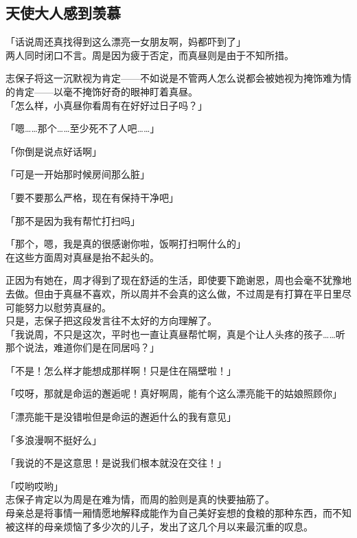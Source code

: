 \subsection{天使大人感到羡慕}

「话说周还真找得到这么漂亮一女朋友啊，妈都吓到了」\\

两人同时闭口不言。周是因为疲于否定，而真昼则是由于不知所措。

志保子将这一沉默视为肯定——不如说是不管两人怎么说都会被她视为掩饰难为情的肯定——以毫不掩饰好奇的眼神盯着真昼。\\

「怎么样，小真昼你看周有在好好过日子吗？」

「嗯……那个……至少死不了人吧……」

「你倒是说点好话啊」

「可是一开始那时候房间那么脏」

「要不要那么严格，现在有保持干净吧」

「那不是因为我有帮忙打扫吗」

「那个，嗯，我是真的很感谢你啦，饭啊打扫啊什么的」\\

在这些方面周对真昼是抬不起头的。

正因为有她在，周才得到了现在舒适的生活，即使要下跪谢恩，周也会毫不犹豫地去做。但由于真昼不喜欢，所以周并不会真的这么做，不过周是有打算在平日里尽可能努力以慰劳真昼的。\\

只是，志保子把这段发言往不太好的方向理解了。\\

「我说周，不只是这次，平时也一直让真昼帮忙啊，真是个让人头疼的孩子……听那个说法，难道你们是在同居吗？」

「不是！怎么样才能想成那样啊！只是住在隔壁啦！」

「哎呀，那就是命运的邂逅呢！真好啊周，能有个这么漂亮能干的姑娘照顾你」

「漂亮能干是没错啦但是命运的邂逅什么的我有意见」

「多浪漫啊不挺好么」

「我说的不是这意思！是说我们根本就没在交往！」

「哎哟哎哟」\\

志保子肯定以为周是在难为情，而周的脸则是真的快要抽筋了。\\

母亲总是将事情一厢情愿地解释成能作为自己美好妄想的食粮的那种东西，而不知被这样的母亲烦恼了多少次的儿子，发出了这几个月以来最沉重的叹息。\\


